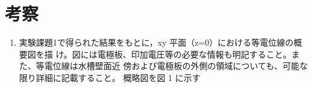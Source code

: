 
\section{考察}

\begin{enumerate}
    \item 実験課題1で得られた結果をもとに，xy 平面（z=0）における等電位線の概要図を描
    け。図には電極板、印加電圧等の必要な情報も明記すること。また、等電位線は水槽壁面近
    傍および電極板の外側の領域についても、可能な限り詳細に記載すること。
    概略図を図 1 に示す
\end{enumerate}